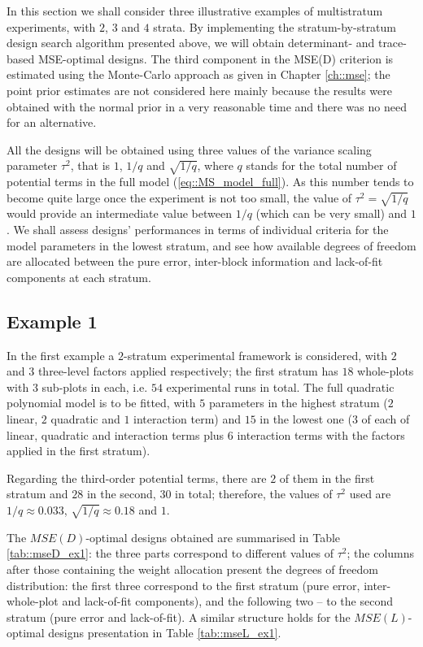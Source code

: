 
In this section we shall consider three illustrative examples of multistratum experiments, with $2$, $3$ and $4$ strata. By implementing the stratum-by-stratum design search algorithm presented above, we will obtain determinant- and trace-based MSE-optimal designs. The third component in the MSE(D) criterion is estimated using the Monte-Carlo approach as given in Chapter \ref{ch::mse}; the point prior estimates are not considered here mainly because the results were obtained with the normal prior in a very reasonable time and there was no need for an alternative. 

All the designs will be obtained using three values of the variance scaling parameter $\tau^2$, that is $1$, $1/q$ and $\sqrt{1/q}$, where $q$ stands for the total number of potential terms in the full model (\ref{eq::MS_model_full}). As this number tends to become quite large once the experiment is not too small, the value of $\tau^2=\sqrt{1/q}$ would provide an intermediate value between $1/q$ (which can be very small) and $1$. We shall assess designs' performances in terms of individual criteria for the model parameters in the lowest stratum, and see how available degrees of freedom are allocated between the pure error, inter-block information and lack-of-fit components at each stratum. 

\subsection{Example 1}

In the first example a $2$-stratum experimental framework is considered, with $2$ and $3$ three-level factors applied respectively; the first stratum has $18$ whole-plots with $3$ sub-plots in each, i.e. $54$ experimental runs in total. The full quadratic polynomial model is to be fitted, with $5$ parameters in the highest stratum ($2$ linear, $2$ quadratic and $1$ interaction term) and $15$ in the lowest one ($3$ of each of linear, quadratic and interaction terms plus $6$ interaction terms with the factors applied in the first stratum).

Regarding the third-order potential terms, there are $2$ of them in the first stratum and $28$ in the second, $30$ in total; therefore, the values of $\tau^2$ used are $1/q\approx 0.033$, $\sqrt{1/q}\approx 0.18$ and $1$.

The $MSE(D)$-optimal designs obtained are summarised in Table \ref{tab::mseD_ex1}: the three parts correspond to different values of $\tau^2$; the columns after those containing the weight allocation present the degrees of freedom distribution: the first three correspond to the first stratum (pure error, inter-whole-plot and lack-of-fit components), and the following two -- to the second stratum (pure error and lack-of-fit). A similar structure holds for the $MSE(L)$-optimal designs presentation in Table \ref{tab::mseL_ex1}.

